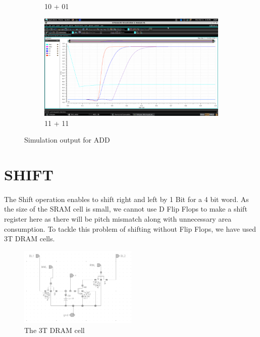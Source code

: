 \begin{figure}[H]
\begin{center}
\begin{subfigure}{0.4\textwidth}
\caption{ 10 + 01 }
\end{subfigure}
\begin{subfigure}{0.4\textwidth}
\includegraphics[width=\textwidth]{chapters/chapter04/add_11+11.png}
\caption{ 11 + 11 }
\end{subfigure}
\end{center}
\caption{Simulation output for ADD }

\end{figure}
\section{SHIFT}
\paragraph{}

The Shift operation enables to shift right and left by 1 Bit for a 4 bit word. As the size of the SRAM cell is small, we cannot use D Flip Flops to make a shift register here as there will be pitch mismatch along with unnecessary area consumption. To tackle this problem of shifting without Flip Flops, we have used 3T DRAM cells.

\begin{figure}[H]
\centering
\includegraphics[width=0.5\textwidth]{dram1.png}
\caption{The 3T DRAM cell}
\label{fig:Figure}
\end{figure}

